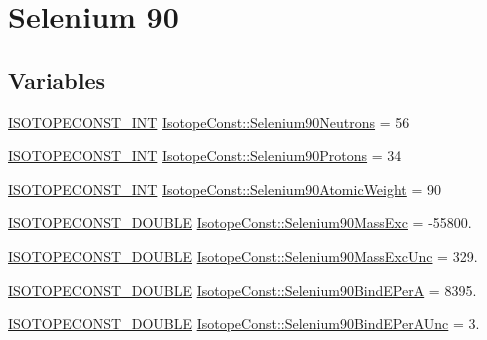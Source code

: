 \hypertarget{group___isotope_const-_selenium-_se90}{}\section{Selenium 90}
\label{group___isotope_const-_selenium-_se90}
\subsection*{Variables}
\begin{DoxyCompactItemize}
\item 
\mbox{\hyperlink{group___isotope_const-_macros_ga5f18360b3e99483a35c32d789e62621c}{I\+S\+O\+T\+O\+P\+E\+C\+O\+N\+S\+T\+\_\+\+I\+NT}} \mbox{\hyperlink{group___isotope_const-_selenium-_se90_gab31e01884ac99c418c2c8a8d8fa561dc}{Isotope\+Const\+::\+Selenium90\+Neutrons}} = 56
\item 
\mbox{\hyperlink{group___isotope_const-_macros_ga5f18360b3e99483a35c32d789e62621c}{I\+S\+O\+T\+O\+P\+E\+C\+O\+N\+S\+T\+\_\+\+I\+NT}} \mbox{\hyperlink{group___isotope_const-_selenium-_se90_ga0e2da876261891863c14ca2fee9c23a5}{Isotope\+Const\+::\+Selenium90\+Protons}} = 34
\item 
\mbox{\hyperlink{group___isotope_const-_macros_ga5f18360b3e99483a35c32d789e62621c}{I\+S\+O\+T\+O\+P\+E\+C\+O\+N\+S\+T\+\_\+\+I\+NT}} \mbox{\hyperlink{group___isotope_const-_selenium-_se90_gaa8106f0454007bcd2de28090fb047079}{Isotope\+Const\+::\+Selenium90\+Atomic\+Weight}} = 90
\item 
\mbox{\hyperlink{group___isotope_const-_macros_ga8f45a7272ce02c0b4c65c44636ed719a}{I\+S\+O\+T\+O\+P\+E\+C\+O\+N\+S\+T\+\_\+\+D\+O\+U\+B\+LE}} \mbox{\hyperlink{group___isotope_const-_selenium-_se90_gaf0964b72ce2550523481e12930ab65e2}{Isotope\+Const\+::\+Selenium90\+Mass\+Exc}} = -\/55800.
\item 
\mbox{\hyperlink{group___isotope_const-_macros_ga8f45a7272ce02c0b4c65c44636ed719a}{I\+S\+O\+T\+O\+P\+E\+C\+O\+N\+S\+T\+\_\+\+D\+O\+U\+B\+LE}} \mbox{\hyperlink{group___isotope_const-_selenium-_se90_ga39dfd7a80c3bd1274bdee4dfc44c1e4b}{Isotope\+Const\+::\+Selenium90\+Mass\+Exc\+Unc}} = 329.
\item 
\mbox{\hyperlink{group___isotope_const-_macros_ga8f45a7272ce02c0b4c65c44636ed719a}{I\+S\+O\+T\+O\+P\+E\+C\+O\+N\+S\+T\+\_\+\+D\+O\+U\+B\+LE}} \mbox{\hyperlink{group___isotope_const-_selenium-_se90_ga5c5cad826eaf63178ec66160898be4ca}{Isotope\+Const\+::\+Selenium90\+Bind\+E\+PerA}} = 8395.
\item 
\mbox{\hyperlink{group___isotope_const-_macros_ga8f45a7272ce02c0b4c65c44636ed719a}{I\+S\+O\+T\+O\+P\+E\+C\+O\+N\+S\+T\+\_\+\+D\+O\+U\+B\+LE}} \mbox{\hyperlink{group___isotope_const-_selenium-_se90_ga0b0c306a3a389639f52047cb65a49af0}{Isotope\+Const\+::\+Selenium90\+Bind\+E\+Per\+A\+Unc}} = 3.

\end{DoxyCompactItemize}
